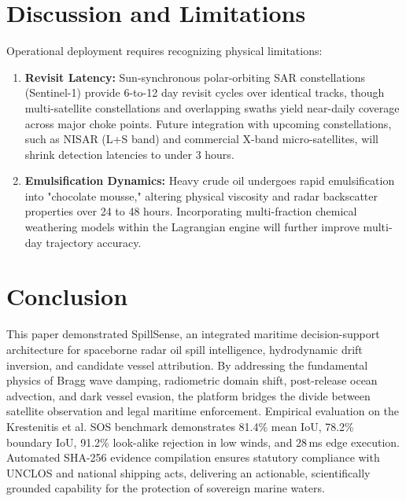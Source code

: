\documentclass[conference]{IEEEtran}
\begin{document}
\section{Discussion and Limitations}

Operational deployment requires recognizing physical limitations:
\begin{enumerate}
    \item \textbf{Revisit Latency:} Sun-synchronous polar-orbiting SAR constellations (Sentinel-1) provide 6-to-12 day revisit cycles over identical tracks, though multi-satellite constellations and overlapping swaths yield near-daily coverage across major choke points. Future integration with upcoming constellations, such as NISAR (L+S band) and commercial X-band micro-satellites, will shrink detection latencies to under 3 hours.
    \item \textbf{Emulsification Dynamics:} Heavy crude oil undergoes rapid emulsification into "chocolate mousse," altering physical viscosity and radar backscatter properties over 24 to 48 hours. Incorporating multi-fraction chemical weathering models within the Lagrangian engine will further improve multi-day trajectory accuracy.
\end{enumerate}

\section{Conclusion}

This paper demonstrated SpillSense, an integrated maritime decision-support architecture for spaceborne radar oil spill intelligence, hydrodynamic drift inversion, and candidate vessel attribution. By addressing the fundamental physics of Bragg wave damping, radiometric domain shift, post-release ocean advection, and dark vessel evasion, the platform bridges the divide between satellite observation and legal maritime enforcement. Empirical evaluation on the Krestenitis et al. SOS benchmark demonstrates 81.4\% mean IoU, 78.2\% boundary IoU, 91.2\% look-alike rejection in low winds, and 28\,ms edge execution. Automated SHA-256 evidence compilation ensures statutory compliance with UNCLOS and national shipping acts, delivering an actionable, scientifically grounded capability for the protection of sovereign marine waters.



\end{document}
